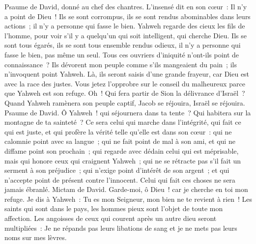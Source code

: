 \begin{multicols}{2}
\VerseOne{}Psaume de David, donné au chef des chantres. L'insensé dit en son cœur~: Il n'y a point de Dieu~! Ils se sont corrompus, ils se sont rendus abominables dans leurs actions~; il n'y a personne qui fasse le bien.
Yahweh regarde des cieux les fils de l'homme, pour voir s'il y a quelqu'un qui soit intelligent, qui cherche Dieu.
Ils se sont tous égarés, ils se sont tous ensemble rendus odieux, il n'y a personne qui fasse le bien, pas même un seul.
Tous ces ouvriers d'iniquité n'ont-ils point de connaissance~? Ils dévorent mon peuple comme s'ils mangeaient du pain~; ils n'invoquent point Yahweh.
Là, ils seront saisis d'une grande frayeur, car Dieu est avec la race des justes.
Vous jetez l'opprobre sur le conseil du malheureux parce que Yahweh est son refuge.
Oh~! Qui fera partir de Sion la délivrance d'Israël~? Quand Yahweh ramènera son peuple captif, Jacob se réjouira, Israël se réjouira.
\VerseOne{}Psaume de David. Ô Yahweh~! qui séjournera dans ta tente~? Qui habitera sur la montagne de ta sainteté~?
Ce sera celui qui marche dans l'intégrité, qui fait ce qui est juste, et qui profère la vérité telle qu'elle est dans son cœur~:
qui ne calomnie point avec sa langue~; qui ne fait point de mal à son ami, et qui ne diffame point son prochain~;
qui regarde avec dédain celui qui est méprisable, mais qui honore ceux qui craignent Yahweh~; qui ne se rétracte pas s'il fait un serment à son préjudice~;
qui n'exige point d'intérêt de son argent~; et qui n'accepte point de présent contre l'innocent. Celui qui fait ces choses ne sera jamais ébranlé.
\VerseOne{}Mictam de David. Garde-moi, ô Dieu~! car je cherche en toi mon refuge.
Je dis à Yahweh~: Tu es mon Seigneur, mon bien ne te revient à rien~!
Les saints qui sont dans le pays, les hommes pieux sont l'objet de toute mon affection.
Les angoisses de ceux qui courent après un autre dieu seront multipliées~: Je ne répands pas leurs libations de sang et je ne mets pas leurs noms sur mes lèvres.

\end{multicols}
